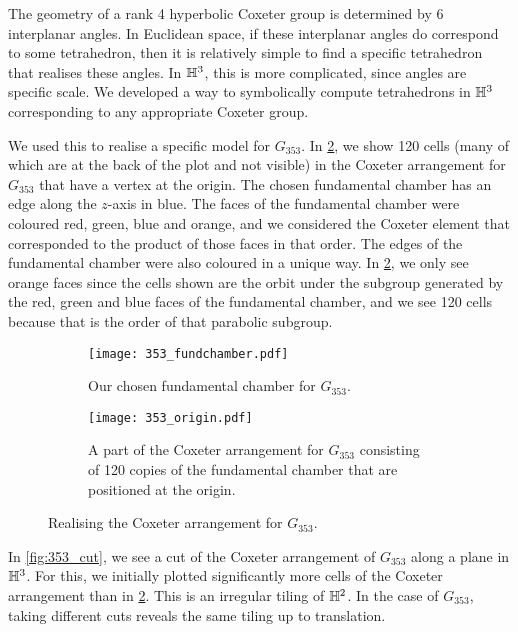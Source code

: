 The geometry of a rank 4 hyperbolic Coxeter group is determined by 6 interplanar angles.
In Euclidean space, if these interplanar angles do correspond to some tetrahedron, then it is relatively simple to find a specific tetrahedron that realises these angles.
In $\mathbb{H}^3$, this is more complicated, since angles are specific scale.
We developed a way to symbolically compute tetrahedrons in $\mathbb{H}^3$ corresponding to any appropriate Coxeter group.

We used this to realise a specific model for $G_{353}$.
In \cref{fig:353_origin}, we show 120  cells (many of which are at the back of the plot and not visible) in the Coxeter arrangement for $G_{353}$ that have a vertex at the origin.
The chosen fundamental chamber has an edge along the $z$-axis in blue.
The faces of the fundamental chamber were coloured red, green, blue and orange, and we considered the Coxeter element that corresponded to the product of those faces in that order.
The edges of the fundamental chamber were also coloured in a unique way.
In \cref{fig:353_origin}, we only see orange faces since the cells shown are the orbit under the subgroup generated by the red, green and blue faces of the fundamental chamber, and we see 120 cells because that is the order of that parabolic subgroup.

\begin{figure}
	\centering
	\begin{subfigure}[t]{.45\textwidth}
		\centering
		\texttt{[image: 353\_fundchamber.pdf]}
		\caption{Our chosen fundamental chamber for $G_{353}$.}
		\label{fig:353_fund_chamber}
	\end{subfigure}
	\hspace{0.2ex}
	\begin{subfigure}[t]{.45\textwidth}
		\centering
		\texttt{[image: 353\_origin.pdf]}
		\caption{A part of the Coxeter arrangement for $G_{353}$ consisting of 120 copies of the fundamental chamber that are positioned at the origin.}
		\label{fig:353_origin}
	\end{subfigure}%
	\caption{Realising the Coxeter arrangement for $G_{353}$.}
	\label{fig:test}
\end{figure}

In \cref{fig:353_cut}, we see a cut of the Coxeter arrangement of $G_{353}$ along a plane in  $\mathbb{H}^3$.
For this, we initially plotted significantly more cells of the Coxeter arrangement than in  \cref{fig:353_origin}.
This is an irregular tiling of $\mathbb{H}^2$.
In the case of  $G_{353}$, taking different cuts reveals the same tiling up to translation.

